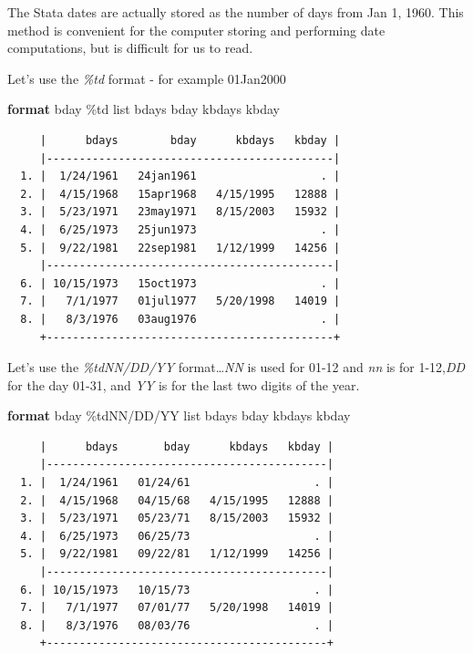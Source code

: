 \documentclass[
]{book}
\newenvironment{Shaded}{\begin{snugshade}}{\end{snugshade}}
\newcommand{\KeywordTok}[1]{\textcolor[rgb]{0.13,0.29,0.53}{\textbf{#1}}}
\newcommand{\NormalTok}[1]{#1}
\newcommand{\OtherTok}[1]{\textcolor[rgb]{0.56,0.35,0.01}{#1}}
\begin{document}
The Stata dates are actually stored as the number of days from Jan 1, 1960. This method is convenient for the computer storing and performing date computations, but is difficult for us to read.

Let's use the \emph{\%td} format - for example 01Jan2000

\begin{Shaded}
\begin{Highlighting}[]
\KeywordTok{format}\NormalTok{ bday \%td }
\OtherTok{list}\NormalTok{ bdays bday kbdays kbday}
\end{Highlighting}
\end{Shaded}

\begin{verbatim}
     |      bdays        bday      kbdays   kbday |
     |--------------------------------------------|
  1. |  1/24/1961   24jan1961                   . |
  2. |  4/15/1968   15apr1968   4/15/1995   12888 |
  3. |  5/23/1971   23may1971   8/15/2003   15932 |
  4. |  6/25/1973   25jun1973                   . |
  5. |  9/22/1981   22sep1981   1/12/1999   14256 |
     |--------------------------------------------|
  6. | 10/15/1973   15oct1973                   . |
  7. |   7/1/1977   01jul1977   5/20/1998   14019 |
  8. |   8/3/1976   03aug1976                   . |
     +--------------------------------------------+
\end{verbatim}

Let's use the \emph{\%tdNN/DD/YY} format\ldots{}\emph{NN} is used for 01-12 and \emph{nn} is for 1-12,\emph{DD} for the day 01-31, and \emph{YY} is for the last two digits of the year.

\begin{Shaded}
\begin{Highlighting}[]
\KeywordTok{format}\NormalTok{ bday \%tdNN/DD/YY}
\OtherTok{list}\NormalTok{ bdays bday kbdays kbday}
\end{Highlighting}
\end{Shaded}

\begin{verbatim}
     |      bdays       bday      kbdays   kbday |
     |-------------------------------------------|
  1. |  1/24/1961   01/24/61                   . |
  2. |  4/15/1968   04/15/68   4/15/1995   12888 |
  3. |  5/23/1971   05/23/71   8/15/2003   15932 |
  4. |  6/25/1973   06/25/73                   . |
  5. |  9/22/1981   09/22/81   1/12/1999   14256 |
     |-------------------------------------------|
  6. | 10/15/1973   10/15/73                   . |
  7. |   7/1/1977   07/01/77   5/20/1998   14019 |
  8. |   8/3/1976   08/03/76                   . |
     +-------------------------------------------+
\end{verbatim}
\end{document}
